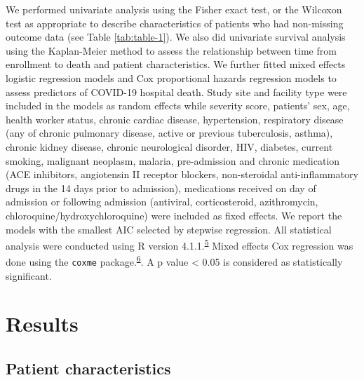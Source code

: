 \documentclass[
  10pt,
]{article}
\begin{document}
We performed univariate analysis using the Fisher exact test, or the
Wilcoxon test as appropriate to describe characteristics of patients who
had non-missing outcome data (see Table \ref{tab:table-1}). We also did
univariate survival analysis using the Kaplan-Meier method to assess the
relationship between time from enrollment to death and patient
characteristics. We further fitted mixed effects logistic regression
models and Cox proportional hazards regression models to assess
predictors of COVID-19 hospital death. Study site and facility type were
included in the models as random effects while severity score, patients'
sex, age, health worker status, chronic cardiac disease, hypertension,
respiratory disease (any of chronic pulmonary disease, active or
previous tuberculosis, asthma), chronic kidney disease, chronic
neurological disorder, HIV, diabetes, current smoking, malignant
neoplasm, malaria, pre-admission and chronic medication (ACE inhibitors,
angiotensin II receptor blockers, non-steroidal anti-inflammatory drugs
in the 14 days prior to admission), medications received on day of
admission or following admission (antiviral, corticosteroid,
azithromycin, chloroquine/hydroxychloroquine) were included as fixed
effects. We report the models with the smallest AIC selected by stepwise
regression. All statistical analysis were conducted using R version
4.1.1.\textsuperscript{\protect\hyperlink{ref-rcoreteam2021}{5}} Mixed
effects Cox regression was done using the \texttt{coxme}
package.\textsuperscript{\protect\hyperlink{ref-therneau2020}{6}}. A p
value \textless{} 0.05 is considered as statistically significant.

\newpage

\hypertarget{results}{%
\section{Results}\label{results}}

\hypertarget{patient-characteristics}{%
\subsection{Patient characteristics}\label{patient-characteristics}}

 
  \providecommand{\huxb}[2]{\arrayrulecolor[RGB]{#1}\global\arrayrulewidth=#2pt}
  \providecommand{\huxvb}[2]{\color[RGB]{#1}\vrule width #2pt}
  \providecommand{\huxtpad}[1]{\rule{0pt}{#1}}
  \providecommand{\huxbpad}[1]{\rule[-#1]{0pt}{#1}}
\end{document}
